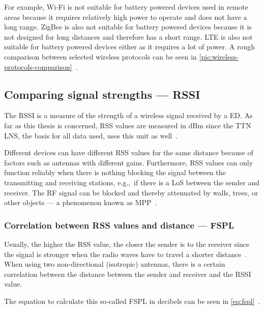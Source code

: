 For example, Wi-Fi is not suitable for battery powered devices used in remote areas because it requires relatively high power to operate and does not have a long range.
ZigBee is also not suitable for battery powered devices because it is not designed for long distances and therefore has a short range.
\ac{LTE} is also not suitable for battery powered devices either as it requires a lot of power.
A rough comparison between selected wireless protocols can be seen in \cref{pic:wireless-protocols-comparison}~\cite{wang_comparison_2021}.

\subsection{Comparing signal strengths — \acl{RSSI}}\label{sec:rssi}

The \acf{RSSI} is a measure of the strength of a wireless signal received by a \acl{ED}.
As far as this thesis is concerned, \ac{RSS} values are measured in dBm since the \ac{TTN} \ac{LNS}, the basis for all data used, uses this unit as well~\cite{the_things_industries_bv_data_2023}.

Different devices can have different \ac{RSS} values for the same distance because of factors such as antennas with different gains.
Furthermore, \ac{RSS} values can only function reliably when there is nothing blocking the signal between the transmitting and receiving stations, e.g.,\ if there is a \acl{LoS} between the sender and receiver.
The \ac{RF} signal can be blocked and thereby attenuated by walls, trees, or other objects --- a phenomenon known as \acf{MPP}~\cite{kucherov_investigation_2021}.

\subsubsection{Correlation between \acs{RSS} values and distance — \acf{FSPL}}\label{sec:background-free-space-path-loss}

Usually, the higher the \ac{RSS} value, the closer the sender is to the receiver since the signal is stronger when the radio waves have to travel a shorter distance~\cite{stutzman_antenna_1981}.
When using two non-directional (isotropic) antennas, there is a certain correlation between the distance between the sender and receiver and the \ac{RSSI} value.

The equation to calculate this so-called \acl{FSPL} in decibels can be seen in \cref{eq:fspl}~\cite[p. 1321]{whitaker_electronics_1996}.

